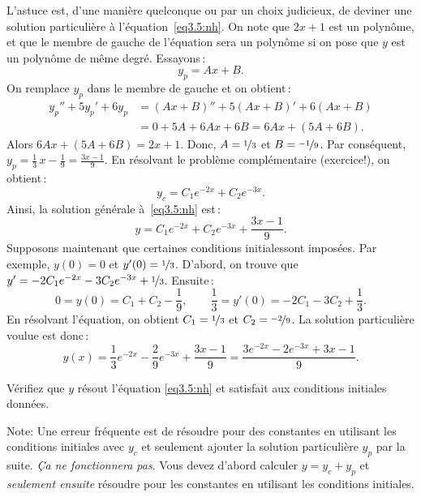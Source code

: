 L'astuce est, d'une manière quelconque ou par un choix judicieux, de deviner une solution particulière à 
l'équation~\eqref{eq3.5:nh}.  On note que $2x+1$ est un polynôme, et que le membre de gauche de l'équation sera un polynôme si on pose que $y$ est un polynôme de même degré. Essayons\,: 
\begin{equation*}
y_p = Ax + B .
\end{equation*}
On remplace $y_p$ dans le membre de gauche et on obtient\,: 
\begin{equation*}
\begin{split}
y_p'' + 5y_p'+ 6y_p & =
(Ax+B)'' + 5(Ax+B)' + 6(Ax+B)
\\
& = 
0 + 5A + 6Ax + 6B = 6Ax+ (5A+6B) .
\end{split}
\end{equation*}
Alors $6Ax+(5A+6B) = 2x+1$.  Donc, $A = \nicefrac{1}{3}$ et $B = \nicefrac{-1}{9}$.
Par conséquent, 
$y_p = \frac{1}{3}\, x - \frac{1}{9} = \frac{3x-1}{9}$.
En résolvant le problème complémentaire (exercice!), on obtient\,: 
\begin{equation*}
y_c = C_1 e^{-2x} + C_2 e^{-3x}.
\end{equation*}
Ainsi, la solution générale à~\eqref{eq3.5:nh} est\,: 
\begin{equation*}
y = C_1 e^{-2x} + C_2 e^{-3x} + \frac{3x-1}{9} .
\end{equation*}
Supposons maintenant que certaines conditions initialessont imposées. Par exemple,  $y(0) = 0$ et
$y'(0) = \nicefrac{1}{3}$.  D'abord, on trouve que $y' = - 2C_1 e^{-2x} - 3C_2 e^{-3x}
+ \nicefrac{1}{3}$.
Ensuite\,: 
\begin{equation*}
0 = y(0) = C_1 + C_2 -\frac{1}{9} , \qquad
\frac{1}{3} = y'(0) = - 2C_1 - 3C_2 + \frac{1}{3} .
\end{equation*}
En résolvant l'équation, on obtient $C_1 = \nicefrac{1}{3}$ et $C_2 = \nicefrac{-2}{9}$.
La solution particulière voulue est donc\,:  
\begin{equation*}
y(x) = \frac{1}{3} e^{-2x} - \frac{2}{9} e^{-3x} + \frac{3x-1}{9} =
\frac{3 e^{-2x} - 2 e^{-3x} + 3x-1}{9} .
\end{equation*}

\begin{exercise}
Vérifiez que $y$ résout  l'équation  \eqref{eq3.5:nh}
et satisfait aux conditions initiales données.  
\end{exercise}

Note: Une erreur fréquente est de résoudre pour des constantes en utilisant les conditions initiales avec  $y_c$ et seulement ajouter la solution particulière $y_p$ par la suite.
 \emph{Ça ne fonctionnera pas}.  Vous devez d'abord calculer $y = y_c + y_p$ et
\emph{seulement ensuite} résoudre pour les constantes en utilisant les conditions initiales. 

